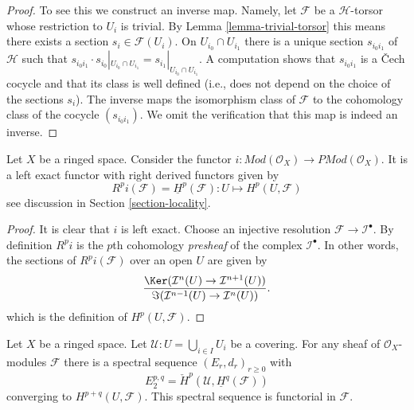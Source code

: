\begin{proof}
To see this we construct an inverse map. Namely, let $\mathcal{F}$ be a
$\mathcal{H}$-torsor whose restriction to $U_i$ is trivial. By
Lemma \ref{lemma-trivial-torsor} this means there
exists a section $s_i \in \mathcal{F}(U_i)$. On $U_{i_0} \cap U_{i_1}$
there is a unique section $s_{i_0i_1}$ of $\mathcal{H}$ such that
$s_{i_0i_1} \cdot s_{i_0}|_{U_{i_0} \cap U_{i_1}} =
s_{i_1}|_{U_{i_0} \cap U_{i_1}}$. A computation shows
that $s_{i_0i_1}$ is a {\v C}ech cocycle and that its class is well
defined (i.e., does not depend on the choice of the sections $s_i$).
The inverse maps the isomorphism class of $\mathcal{F}$ to the cohomology
class of the cocycle $(s_{i_0i_1})$.
We omit the verification that this map is indeed an inverse.
\end{proof}

\begin{lemma}
\label{lemma-include}
Let $X$ be a ringed space.
Consider the functor
$i : \textit{Mod}(\mathcal{O}_X) \to \textit{PMod}(\mathcal{O}_X)$.
It is a left exact functor with right derived functors given by
$$
R^pi(\mathcal{F}) = \underline{H}^p(\mathcal{F}) :
U \longmapsto H^p(U, \mathcal{F})
$$
see discussion in Section \ref{section-locality}.
\end{lemma}

\begin{proof}
It is clear that $i$ is left exact.
Choose an injective resolution $\mathcal{F} \to \mathcal{I}^\bullet$.
By definition $R^pi$ is the $p$th cohomology {\it presheaf}
of the complex $\mathcal{I}^\bullet$. In other words, the
sections of $R^pi(\mathcal{F})$ over an open $U$ are given by
$$
\frac{\Ker(\mathcal{I}^n(U) \to \mathcal{I}^{n + 1}(U))}
{\Im(\mathcal{I}^{n - 1}(U) \to \mathcal{I}^n(U))}.
$$
which is the definition of $H^p(U, \mathcal{F})$.
\end{proof}

\begin{lemma}
\label{lemma-cech-spectral-sequence}
Let $X$ be a ringed space.
Let $\mathcal{U} : U = \bigcup_{i \in I} U_i$ be a covering.
For any sheaf of $\mathcal{O}_X$-modules $\mathcal{F}$ there
is a spectral sequence $(E_r, d_r)_{r \geq 0}$ with
$$
E_2^{p, q} = \check{H}^p(\mathcal{U}, \underline{H}^q(\mathcal{F}))
$$
converging to $H^{p + q}(U, \mathcal{F})$.
This spectral sequence is functorial in $\mathcal{F}$.
\end{lemma}


